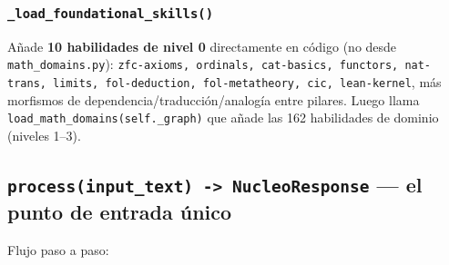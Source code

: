 \documentclass[11pt,a4paper]{report}
\newcommand{\code}[1]{\texttt{#1}}
\begin{document}
\subsubsection{\code{\_load_foundational_skills()}}
\label{sec:foundational}
A\~nade \textbf{10 habilidades de nivel 0} directamente en c\'odigo (no desde \code{math\_domains.py}): \code{zfc-axioms, ordinals, cat-basics, functors, nat-trans, limits, fol-deduction, fol-metatheory, cic, lean-kernel}, m\'as morfismos de dependencia/traducci\'on/analog\'ia entre pilares. Luego llama \code{load_math_domains(self.\_graph)} que a\~nade las 162 habilidades de dominio (niveles 1--3).

\subsection{\code{process(input_text) -> NucleoResponse} --- el punto de entrada \'unico}
\label{sec:process}
Flujo paso a paso:
\end{document}
